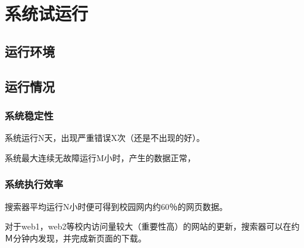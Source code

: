 \chapter{系统试运行}
\section{运行环境}

\section{运行情况}
\subsection{系统稳定性}
系统运行N天，出现严重错误X次（还是不出现的好）。

系统最大连续无故障运行M小时，产生的数据正常，
\subsection{系统执行效率}
搜索器平均运行N小时便可得到校园网内约60％的网页数据。

对于web1，web2等校内访问量较大（重要性高）的网站的更新，搜索器可以在约Ｍ分钟内发现，并完成新页面的下载。


